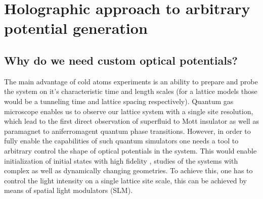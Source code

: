 
\chapter{Holographic approach to arbitrary potential generation}

\section{Why do we need custom optical potentials?}
The main advantage of cold atoms experiments is an ability to prepare and probe the system on it's characteristic time and length scales (for a lattice models those would be a tunneling time and lattice spacing respectively). Quantum gas microscope enables us to observe our lattice system with a single site resolution, which lead to the first direct observation of superfluid to Mott insulator \cite{Bakr2010, bloch} as well as paramagnet to aniferromagent \cite{Simon2011, Parsons??} quantum phase transitions. However, in order to fully enable the capabilities of such quantum simulators one needs a tool to arbitrary control the shape of optical potentials in the system. This would enable initialization of initial states with high fidelity \cite{us, somebody else?}, studies of the systems with complex \cite{Tilman QPC, Roatti QPC} as well as dynamically changing \cite{??} geometries. To achieve this, one has to control the light intensity on a single lattice site scale, this can be achieved by means of spatial light modulators (SLM).

